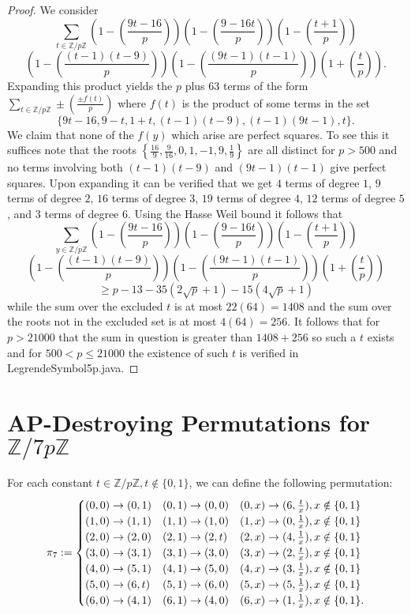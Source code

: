\documentclass[12pt]{amsart}
\theoremstyle{definition}
\theoremstyle{remark}
\newcommand{\Z}{\mathbb Z}
\begin{document}
\begin{proof}
We consider
\[\sum_{t\in \Z/p\Z}(1-(\frac{9t-16}{p}))(1-(\frac{9-16t}{p}))(1-(\frac{t+1}{p}))\]\[(1-(\frac{(t-1)(t-9)}{p}))(1-(\frac{(9t-1)(t-1)}{p}))(1+(\frac{t}{p})).\]
Expanding this product yields the $p$ plus $63$ terms of the form $\sum_{t\in\Z/p\Z}\pm(\frac{\pm f(t)}{p})$ where $f(t)$ is the product of some terms in the set
\[\{9t-16,9-t,1+t,(t-1)(t-9),(t-1)(9t-1),t\}.\]
We claim that none of the $f(y)$ which arise are perfect squares. To see this it suffices note that the roots $\left\{\frac{16}{9},\frac{9}{16},0,1,-1,9,\frac{1}{9}\right\}$ are all distinct for $p>500$ and no terms involving both $(t-1)(t-9)$ and $(9t-1)(t-1)$ give perfect squares. Upon expanding it can be verified that we get $4$ terms of degree $1$, $9$ terms of degree $2$, $16$ terms of degree $3$, $19$ terms of degree $4$, $12$ terms of degree $5$, and $3$ terms of degree $6$. Using the Hasse Weil bound it follows that 
\[\sum_{y\in \Z/p\Z}(1-(\frac{9t-16}{p}))(1-(\frac{9-16t}{p}))(1-(\frac{t+1}{p}))\]\[(1-(\frac{(t-1)(t-9)}{p}))(1-(\frac{(9t-1)(t-1)}{p}))(1+(\frac{t}{p}))\]
\[\ge p-13-35(2\sqrt{p}+1)-15(4\sqrt{p}+1)\] while the sum over the excluded $t$ is at most $22(64)=1408$ and the sum over the roots not in the excluded set is at most $4(64)=256$. It follows that for $p>21000$ that the sum in question is greater than $1408+256$ so such a $t$ exists and for $500<p\le 21000$ the existence of such $t$ is verified in LegrendeSymbol5p.java. 
\end{proof}
\section{AP-Destroying Permutations for $\Z/7p\Z$}
For each constant $t\in \Z/p\Z, t\notin\{0, 1\}$, we can define the following permutation:\[\pi_7 :=  \setlength{\arraycolsep}{0pt}
\renewcommand{\arraystretch}{1.2}
\left\{\begin{array}{l @{\quad} l @{\quad}l}
      (0, 0)\to (0, 1) & (0, 1)\to (0, 0) & (0, x)\to (6, \frac{t}{x}), x\notin\{0, 1\}
      \\ (1, 0)\to (1, 1) & (1, 1)\to (1, 0) & (1, x)\to (0, \frac{1}{x}), x\notin\{0, 1\}
      \\ (2, 0)\to (2, 0) & (2, 1)\to (2, t) & (2, x)\to (4, \frac{1}{x}), x\notin\{0, 1\}
      \\ (3, 0)\to (3, 1) & (3, 1)\to (3, 0) & (3, x)\to (2, \frac{t}{x}), x\notin\{0, 1\}
      \\ (4, 0)\to (5, 1) & (4, 1)\to (5, 0) & (4, x)\to (3, \frac{1}{x}), x\notin\{0, 1\}
      \\ (5, 0)\to (6, t) & (5, 1)\to (6, 0) & (5, x)\to (5, \frac{1}{x}), x\notin\{0, 1\}
      \\ (6, 0)\to (4, 1) & (6, 1)\to (4, 0) & (6, x)\to (1, \frac{1}{x}), x\notin\{0, 1\}.
\end{array}\right.\]
\end{document}
